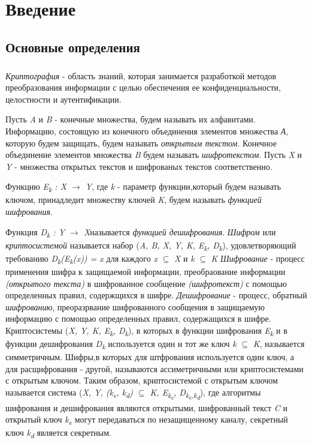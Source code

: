 \newpage
\chapter{Введение}

\section{Основные определения}
\paragraph{} \textit{Криптография} - область знаний, которая занимается разработкой методов преобразования информации с целью обеспечения ее 
конфиденциальности, целостности и аутентификации.

  Пусть \textit{A} и \textit{B}  - конечные множества, будем называть их алфавитами. Информацию, состоящую из конечного объединения элементов 
множества \textit{А}, которую будем защищать, будем называть \textit{открытым текстом}. Конечное объединение элементов множества \textit{B} будем 
называть \textit{шифротекстом}. Пусть \textit{X} и \textit{Y} - множества открытых текстов и шифрованых текстов соответственно.

  Функцию \textit{E\textsubscript{k} : \textit{X} {$\rightarrow$} \textit{Y}}, где \textit{k} - параметр функции,который будем называть ключом, 
принадледит множеству ключей \textit{K}, будем называть \textit{функцией шифрования}. 

  Функция \textit{D\textsubscript{k} : \textit{Y} {$\rightarrow$} \textit{X}}называется \textit{функцией дешифрования}.
  \textit{Шифром} или \textit{криптосистемой} называется набор (\textit{A, B, X, Y, K, E\textsubscript{k}, D\textsubscript{k}}), удовлетворяющий 
требованию \textit{D\textsubscript{k}(E\textsubscript{k}(x)) = x} для каждого \textit{x} {$\subseteq$} \textit{X} и \textit{k} {$\subseteq$} \textit{K}
  \textit{Шифрование} - процесс применения шифра к защищаемой информации, преобраование информации \textit{(открытого текста)} в шифрованное сообщение 
\textit{(шифротекст)} с помощью определенных правил, содержщихся в шифре.
  \textit{Дешифрование} - процесс, обратный \textit{шифрованию}, преоразрвание шифрованного сообщения в защищаемую информацию с помощью определенных 
правил, содержащихся в шифре.
  Криптосистемы (\textit{X, Y, K, E\textsubscript{k}, D\textsubscript{k}}), в которых в функции шифрования \textit{E\textsubscript{k}} и в функции 
дешифрования \textit{D\textsubscript{k}} используется один и тот же ключ \textit{k} {$\subseteq$} \textit{K}, называется симметричным. Шифры,в которых 
для штфрования используется один ключ, а для расщифрования - другой, называются ассиметричными или криптосистемами с открытым ключом. Таким образом, 
криптосистемой с открытым ключом называется система 
(\textit{X, Y, (k\textsubscript{e}, k\textsubscript{d}) {$\subseteq$} K, E\textsubscript{k\textsubscript{e}}, D\textsubscript{k\textsubscript{e},k\textsubscript{d}}}), 
где алгоритмы шифрования и дешифрования являются открытыми, шифрованный текст \textit{C} и открытый ключ \textit{k\textsubscript{e}} могут 
передаваться по незащищенному каналу, секретный ключ \textit{k\textsubscript{d}} является секретным.

